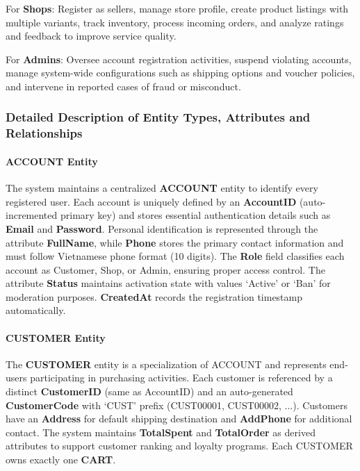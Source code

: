 For \textbf{Shops}: Register as sellers, manage store profile, create product listings with multiple variants, track inventory, process incoming orders, and analyze ratings and feedback to improve service quality.

For \textbf{Admins}: Oversee account registration activities, suspend violating accounts, manage system-wide configurations such as shipping options and voucher policies, and intervene in reported cases of fraud or misconduct.

\subsubsection{Detailed Description of Entity Types, Attributes and Relationships}

\paragraph{ACCOUNT Entity}

The system maintains a centralized \textbf{ACCOUNT} entity to identify every registered user. Each account is uniquely defined by an \textbf{AccountID} (auto-incremented primary key) and stores essential authentication details such as \textbf{Email} and \textbf{Password}. Personal identification is represented through the attribute \textbf{FullName}, while \textbf{Phone} stores the primary contact information and must follow Vietnamese phone format (10 digits). The \textbf{Role} field classifies each account as Customer, Shop, or Admin, ensuring proper access control. The attribute \textbf{Status} maintains activation state with values `Active' or `Ban' for moderation purposes. \textbf{CreatedAt} records the registration timestamp automatically.

\paragraph{CUSTOMER Entity}

The \textbf{CUSTOMER} entity is a specialization of ACCOUNT and represents end-users participating in purchasing activities. Each customer is referenced by a distinct \textbf{CustomerID} (same as AccountID) and an auto-generated \textbf{CustomerCode} with `CUST' prefix (CUST00001, CUST00002, ...). Customers have an \textbf{Address} for default shipping destination and \textbf{AddPhone} for additional contact. The system maintains \textbf{TotalSpent} and \textbf{TotalOrder} as derived attributes to support customer ranking and loyalty programs. Each CUSTOMER owns exactly one \textbf{CART}.


